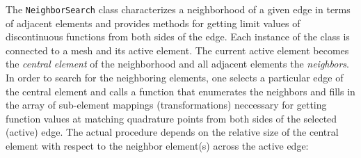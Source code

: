 The \lstinline[basicstyle=\ttfamily]{NeighborSearch} class characterizes a neighborhood of a given edge in terms of adjacent
elements and provides methods for getting limit values of discontinuous functions from both sides of the edge. Each instance of the
class is connected to a mesh and its active element. The current active element becomes the \textit{central element} of
the neighborhood and all adjacent elements the \textit{neighbors}. In order to search for the neighboring elements, one
selects a particular edge of the central element and calls a function that enumerates the neighbors and fills in the
array of sub-element mappings (transformations) neccessary for getting function values at matching quadrature points
from both sides of the selected (active) edge.
The actual procedure depends on the relative size of the central element with respect to the neighbor element(s) across
the active edge:
